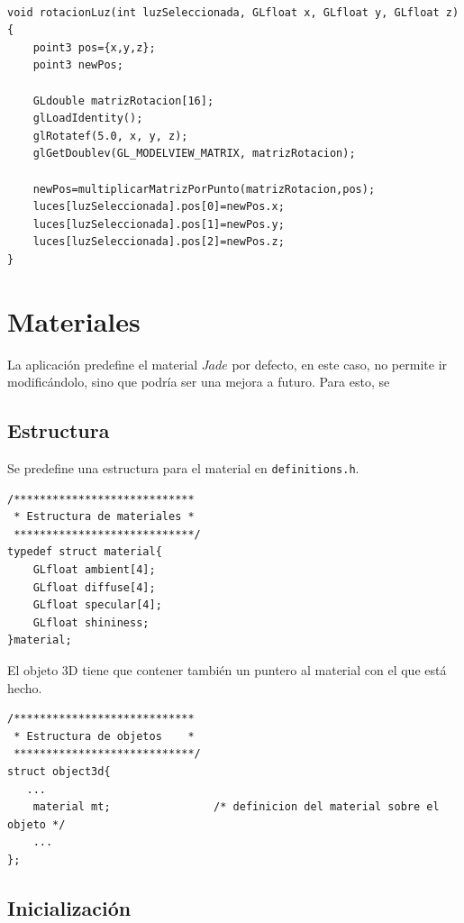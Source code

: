 \documentclass[12pt,a4paper]{article}
\begin{document}
\begin{lstlisting}

void rotacionLuz(int luzSeleccionada, GLfloat x, GLfloat y, GLfloat z) {
    point3 pos={x,y,z};
    point3 newPos;

    GLdouble matrizRotacion[16];
    glLoadIdentity();
    glRotatef(5.0, x, y, z);
    glGetDoublev(GL_MODELVIEW_MATRIX, matrizRotacion);

    newPos=multiplicarMatrizPorPunto(matrizRotacion,pos);
    luces[luzSeleccionada].pos[0]=newPos.x;
    luces[luzSeleccionada].pos[1]=newPos.y;
    luces[luzSeleccionada].pos[2]=newPos.z;
}

\end{lstlisting}





\newpage
\section{Materiales}
 
 La aplicación predefine el material $Jade$ por defecto, en este caso, no permite ir modificándolo, sino que podría ser una mejora a futuro. Para esto, se 

\subsection{Estructura}

Se predefine una estructura para el material en \texttt{definitions.h}.

\begin{lstlisting}
/****************************
 * Estructura de materiales *
 ****************************/
typedef struct material{
	GLfloat ambient[4];
	GLfloat diffuse[4];
	GLfloat specular[4];
	GLfloat shininess;
}material;
\end{lstlisting}

El objeto 3D tiene que contener también un puntero al material con el que está hecho.

\begin{lstlisting}
/****************************
 * Estructura de objetos    *
 ****************************/
struct object3d{
   ...
    material mt;			    /* definicion del material sobre el objeto */
    ...
};
\end{lstlisting}


\subsection{Inicialización}
\end{document}
